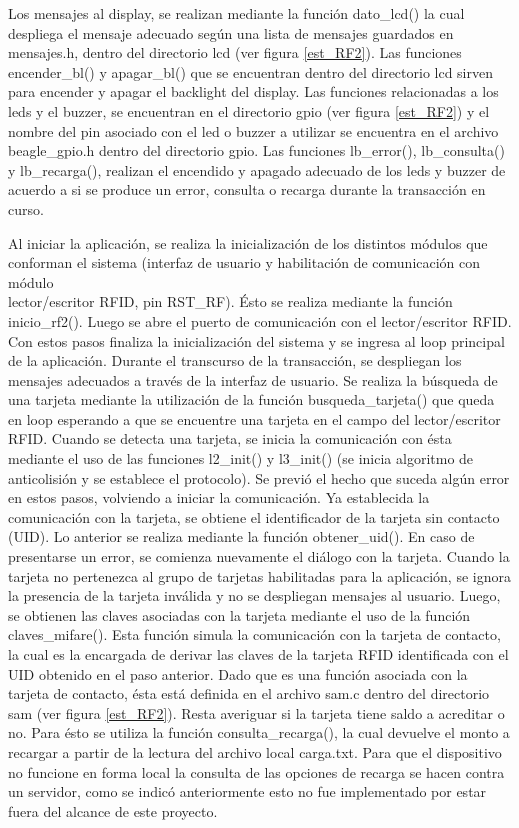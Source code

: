 \bigskip
Los mensajes al display, se realizan mediante la función dato\_lcd() la cual despliega el mensaje adecuado según una lista de mensajes guardados en mensajes.h, dentro del directorio lcd (ver figura \ref{est_RF2}). Las funciones encender\_bl() y apagar\_bl() que se encuentran dentro del directorio lcd sirven para encender y apagar el backlight del display.
Las funciones relacionadas a los leds y el buzzer, se encuentran en el directorio gpio (ver figura \ref{est_RF2}) y el nombre del pin asociado con el led o buzzer a utilizar se encuentra en el archivo beagle\_gpio.h dentro del directorio gpio. Las funciones lb\_error(), lb\_consulta() y lb\_recarga(), realizan el encendido y apagado adecuado de los leds y buzzer de acuerdo a si se produce un error, consulta o recarga durante la transacción en curso.
 
\bigskip
Al iniciar la aplicación, se realiza la inicialización de los distintos módulos que conforman el sistema (interfaz de usuario y habilitación de comunicación con módulo\\
 lector/escritor RFID, pin RST\_RF). Ésto se realiza mediante la función inicio\_rf2(). Luego se abre el puerto de comunicación con el lector/escritor RFID. Con estos pasos finaliza la inicialización del sistema y se ingresa al loop principal de la aplicación.
Durante el transcurso de la transacción, se despliegan los mensajes adecuados a través de la interfaz de usuario.
Se realiza la búsqueda de una tarjeta mediante la utilización de la función busqueda\_tarjeta() que queda en loop esperando a que se encuentre una tarjeta en el campo del lector/escritor RFID.
Cuando se detecta una tarjeta, se inicia la comunicación con ésta mediante el uso de las funciones l2\_init() y l3\_init() (se inicia algoritmo de anticolisión y se establece el protocolo). Se previó el hecho que suceda algún error en estos pasos, volviendo a iniciar la comunicación.
Ya establecida la comunicación con la tarjeta, se obtiene el identificador de la tarjeta sin contacto (UID). Lo anterior se realiza mediante la función obtener\_uid(). En caso de presentarse un error, se comienza nuevamente el diálogo con la tarjeta. Cuando la tarjeta no pertenezca al grupo de tarjetas habilitadas para la aplicación, se ignora la presencia de la tarjeta inválida y no se despliegan mensajes al usuario.
Luego, se obtienen las claves asociadas con la tarjeta mediante el uso de la función claves\_mifare(). Esta función simula la comunicación con la tarjeta de contacto, la cual es la
encargada de derivar las claves de la tarjeta RFID identificada con el UID
obtenido en el paso anterior. Dado que es una función asociada con la tarjeta de contacto, ésta está definida en el archivo sam.c dentro del directorio sam (ver figura \ref{est_RF2}).
Resta averiguar si la tarjeta tiene saldo a acreditar o no. Para ésto se utiliza la función consulta\_recarga(), la cual devuelve el monto a recargar a partir de la lectura del archivo local carga.txt. Para que el dispositivo no funcione en forma local la consulta de las opciones de recarga se hacen contra un servidor, como se indicó anteriormente esto no fue implementado por estar fuera del alcance de este proyecto.

